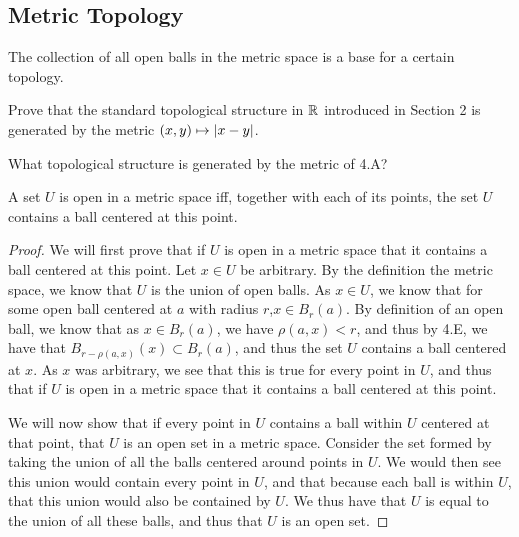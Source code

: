 \subsection{Metric Topology}

\begin{majorEx}%
    The collection of all open balls in the metric space is a base for a certain
    topology.
\end{majorEx}

\begin{majorEx}%
    Prove that the standard topological structure in $\mathbb{R}$ introduced in Section
    2 is generated by the metric $(x, y) \mapsto |x - y|$.
\end{majorEx}

\begin{minorEx}
    What topological structure is generated by the metric of 4.A?
\end{minorEx}

\begin{majorEx}%
  A set $U$ is open in a metric space iff, together
  with each of its points, the set $U$ contains a
  ball centered at this point.
\end{majorEx}

\begin{proof}
  We will first prove that if $U$ is open in a metric space that it
  contains a ball centered at this point. Let $x \in U$ be arbitrary.
  By the definition the metric space, we know that $U$
  is the union of open balls. As $x \in U$, we know that for some open
  ball centered at $a$ with radius $r$,$x \in B_r(a)$. By definition
  of an open ball, we know that as $x \in B_r(a)$, we have
  $\rho(a,x)<r$, and thus by 4.E, we have that
  $B_{r-\rho(a,x)}(x)\subset B_r(a)$, and thus  the set $U$ contains a
  ball centered at $x$. As $x$ was arbitrary, we see that this is true
  for every point in $U$, and thus that if $U$ is open in a metric space that it
  contains a ball centered at this point.

  We will now show that if every point in $U$ contains a ball within $U$ centered
  at that point, that $U$ is an open set in a metric space. Consider
  the set formed by taking the union of all the balls centered around
  points in $U$. We would then see this union would contain every
  point in $U$, and that because each ball is within $U$, that this
  union would also be contained by $U$. We thus have that $U$ is equal
  to the union of all these balls, and thus that $U$ is an open set.
\end{proof}
